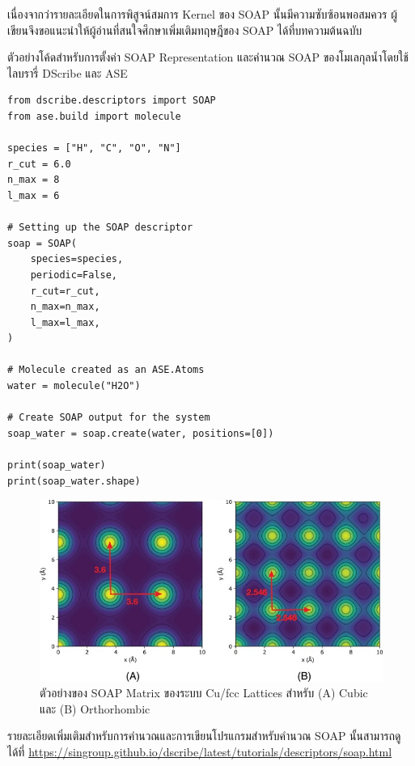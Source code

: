 เนื่องจากว่ารายละเอียดในการพิสูจน์สมการ Kernel ของ SOAP นั้นมีความซับซ้อนพอสมควร ผู้เขียนจึงขอแนะนำให้ผู้อ่านที่สนใจศึกษาเพิ่มเติมทฤษฎีของ SOAP ได้ที่บทความต้นฉบับ\autocite{bartok2013}

ตัวอย่างโค้ดสำหรับการตั้งค่า SOAP Representation และคำนวณ SOAP ของโมเลกุลน้ำโดยใช้ไลบรารี่ DScribe และ ASE

\begin{lstlisting}[style=MyPython]
from dscribe.descriptors import SOAP
from ase.build import molecule

species = ["H", "C", "O", "N"]
r_cut = 6.0
n_max = 8
l_max = 6

# Setting up the SOAP descriptor
soap = SOAP(
    species=species,
    periodic=False,
    r_cut=r_cut,
    n_max=n_max,
    l_max=l_max,
)

# Molecule created as an ASE.Atoms
water = molecule("H2O")

# Create SOAP output for the system
soap_water = soap.create(water, positions=[0])

print(soap_water)
print(soap_water.shape)
\end{lstlisting}

\vspace{1em}

\begin{figure}[H]
    \centering
    \includegraphics[width=\linewidth]{fig/soap_matrix.jpg}
    \caption{ตัวอย่างของ SOAP Matrix ของระบบ Cu/fcc Lattices สำหรับ (A) Cubic และ (B) Orthorhombic}
    \label{fig:soap_matrix}
\end{figure}

\vspace{1em}

รายละเอียดเพิ่มเติมสำหรับการคำนวณและการเขียนโปรแกรมสำหรับคำนวณ SOAP นั้นสามารถดูได้ที่
\url{https://singroup.github.io/dscribe/latest/tutorials/descriptors/soap.html}

